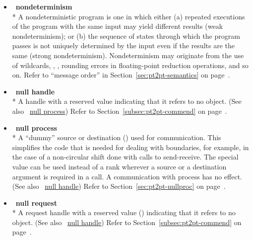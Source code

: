 \begin{itemize}
\label{glossary:nondeterminism}
\item  ~\hypertarget{glossary:nondeterminism}{\textbf{nondeterminism}} \\*
A nondeterministic program is one in which either (a) repeated executions 
of the program with the same input may yield different results (weak 
nondeterminism); or (b) the sequence of states through which the program 
passes is not uniquely determined by the input even if the results are the 
same (strong nondeterminism). Nondeterminism may originate from the 
use of wildcards, , , rounding errors in floating-point 
reduction operations, and so on.
Refer to ``message order'' in Section~\ref{sec:pt2pt-semantics} on page~\pageref{sec:pt2pt-semantics}.

\label{glossary:null_handle}
\item  ~\hypertarget{glossary:null_handle}{\textbf{null handle}} \\*
A handle with a reserved value indicating that it refers to no object.
(See also ~\hyperlink{glossary:null_process}{null process})
Refer to Section~\ref{subsec:pt2pt-commend} on page~\pageref{subsec:pt2pt-commend}.

\label{glossary:null_process}
\item  ~\hypertarget{glossary:null_process}{\textbf{null process}} \\*
A ``dummy'' source or
destination () used
for communication.  This simplifies the code that is needed for dealing with
boundaries, for example, in the case of a non-circular shift done with calls to
send-receive.
The special value  can be used
instead of a rank wherever a
source or a destination argument is required in a call.   A communication
with process  has no effect.
(See also ~\hyperlink{glossary:null_handle}{null handle})
Refer to Section~\ref{sec:pt2pt-nullproc} on page~\pageref{sec:pt2pt-nullproc}.

\label{glossary:null_request}
\item  ~\hypertarget{glossary:null_request}{\textbf{null request}} \\*
A request handle with a reserved value () indicating that it refers to no object.
(See also ~\hyperlink{glossary:null_handle}{null handle})
Refer to Section~\ref{subsec:pt2pt-commend} on page~\pageref{subsec:pt2pt-commend}.


\end{itemize}
